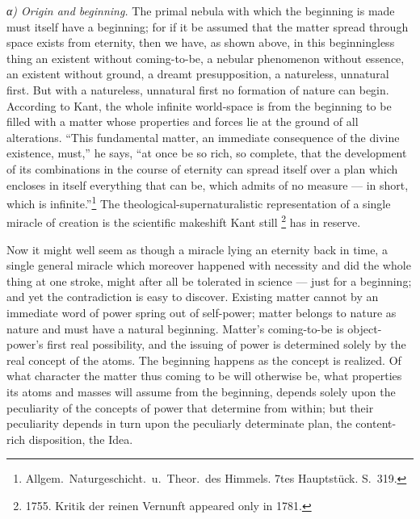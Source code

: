 \documentclass[12pt,a4paper]{book}
\renewcommand{\thefootnote}{*)}
\newcommand{\subrunin}[1]{\emph{#1}\hspace{0.4em}}
\begin{document}
\subrunin{α) Origin and beginning.} The primal nebula with which the beginning is made must itself have a
beginning; for if it be assumed that the matter spread through space exists from eternity, then we have, as
shown above, in this beginningless thing an existent without coming-to-be, a nebular phenomenon without
essence, an existent without ground, a dreamt presupposition, a natureless, unnatural first. But with a
natureless, unnatural first no formation of nature can begin. According to
Kant, the whole infinite world-space is from the beginning to be filled with a matter whose properties and
forces lie at the ground of all alterations. ``This fundamental matter, an immediate consequence of the divine
existence, must,'' he says, ``at once be so rich, so complete, that the development of its combinations in the
course of eternity can spread itself over a plan which encloses in itself everything that can be, which admits
of no measure --- in short, which is infinite.''\footnote{%
Allgem.\ Naturgeschicht.\ u.\ Theor.\ des Himmels. 7tes Hauptstück. S.\ 319.} The
theological-supernaturalistic representation of a single miracle of creation is the scientific makeshift Kant
still%
\renewcommand{\thefootnote}{**)}%
\footnote{%
1755. Kritik der reinen Vernunft appeared only in 1781.}%
\renewcommand{\thefootnote}{*)}
has in reserve.

Now it might well seem as though a miracle lying an eternity back in time, a single general miracle which
moreover happened with necessity and did the whole thing at one stroke, might after all be tolerated in science
--- just for a beginning; and yet the contradiction is easy to discover. Existing matter cannot by an immediate
word of power spring out of self-power; matter belongs to nature as nature and must have a natural beginning.
Matter's coming-to-be is object-power's first real possibility, and the issuing of power is determined solely by
the real concept of the atoms. The beginning happens as the concept is realized. Of what character the matter
thus coming to be will otherwise be, what properties its atoms and masses will assume from the beginning,
depends solely upon the peculiarity of the concepts of power that determine from within; but their peculiarity
depends in turn upon the peculiarly determinate plan, the content-rich disposition, the Idea.
\end{document}
